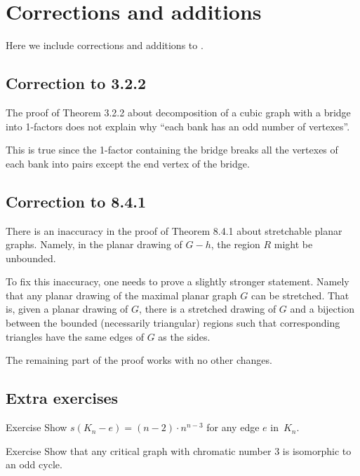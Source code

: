 \chapter{Corrections and additions}

Here we include corrections and additions to \cite{hartsfield-ringel}.

\section*{Correction to 3.2.2}

The proof of Theorem 3.2.2 about decomposition of a cubic graph with a bridge into 1-factors
does not explain why ``each bank has an odd number of vertexes''.

This is true since the 1-factor containing the bridge breaks all the vertexes of each bank into pairs except the end vertex of the bridge.


\section*{Correction to 8.4.1}

There is an inaccuracy in the proof of Theorem 8.4.1 about stretchable planar graphs.
Namely, in the planar drawing of $G-h$, the region $R$ might be unbounded.

To fix this inaccuracy, one needs to prove a slightly stronger statement.
Namely that any planar drawing of the maximal planar graph $G$ can be stretched.
That is, given a planar drawing of $G$, there is a stretched drawing of $G$ 
and a bijection between the bounded (necessarily triangular) regions such that corresponding triangles have the same edges of $G$ as the sides.

The remaining part of the proof works with no other changes.

\section*{Extra exercises}

\begin{thm}{Exercise}
Show $s(K_n-e)=(n-2)\cdot n^{n-3}$ for any edge $e$ in~$K_n$. 
\end{thm}

\begin{thm}{Exercise}
Show that any critical graph with chromatic number 3 is isomorphic to an odd cycle.
\end{thm}

